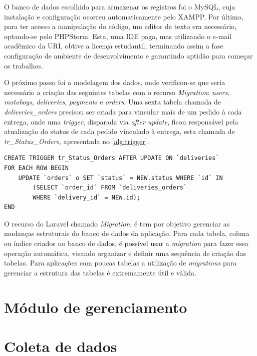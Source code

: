 O banco de dados escolhido para armazenar os registros foi o MySQL, cuja instalação e configuração ocorreu automaticamente pelo XAMPP. Por último, para ter acesso a manipulação do código, um editor de texto era necessário, optando-se pelo PHPStorm. Esta, uma IDE paga, mas utilizando o e-mail acadêmico da URI, obtive a licença estudantil, terminando assim a fase configuração de ambiente de desenvolvimento e garantindo aptidão para começar os trabalhos.

O próximo passo foi a modelagem dos dados, onde verificou-se que seria necessário a criação das seguintes tabelas com o recurso \textit{Migration}: \textit{users}, \textit{motoboys}, \textit{deliveries}, \textit{payments} e \textit{orders}. Uma sexta tabela chamada de \textit{deliveries\_orders} precisou ser criada para vincular mais de um pedido à cada entrega, onde uma \textit{trigger}, disparada via \textit{after update}, ficou responsável pela atualização do status de cada pedido vinculado à entrega, esta chamada de \textit{tr\_Status\_Orders}, apresentada no \autoref{alg:trigger}.

\begin{lstlisting}[caption={Trigger tr\_Status\_Orders}, label=alg:trigger, style=SQL]
CREATE TRIGGER tr_Status_Orders AFTER UPDATE ON `deliveries`
FOR EACH ROW BEGIN
    UPDATE `orders` o SET `status` = NEW.status WHERE `id` IN
        (SELECT `order_id` FROM `deliveries_orders`
        WHERE `delivery_id` = NEW.id); 
END
\end{lstlisting}

O recurso do Laravel chamado \textit{Migration}, é tem por objetivo gerenciar as mudanças estruturais do banco de dados da aplicação. Para cada tabela, coluna ou índice criados no banco de dados, é possível usar a \textit{migration} para fazer essa operação automática, visando organizar e definir uma sequência de criação das tabelas. Para aplicações com poucas tabelas a utilização de \textit{migrations} para gerenciar a estrutura das tabelas é extremamente útil e válida.

\newpage
\section{Módulo de gerenciamento}


\newpage
\section{Coleta de dados}


